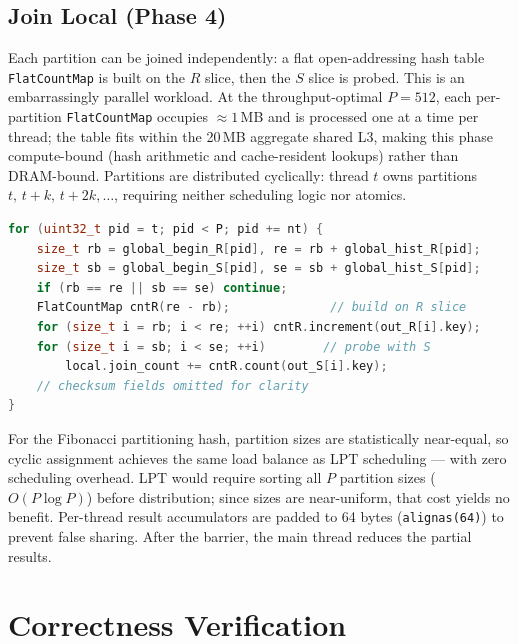 \documentclass[10pt,a4paper,twocolumn]{article}
\begin{document}
\subsection*{Join Local (Phase 4)}

Each partition can be joined independently: a flat open-addressing hash table \texttt{FlatCountMap} is built on the $R$ slice, then the $S$ slice is probed. This is an embarrassingly parallel workload. At the throughput-optimal $P=512$, each per-partition \texttt{FlatCountMap} occupies $\approx1$\,MB and is processed one at a time per thread; the table fits within the 20\,MB aggregate shared L3, making this phase compute-bound (hash arithmetic and cache-resident lookups) rather than DRAM-bound. Partitions are distributed cyclically: thread $t$ owns partitions $t,\,t{+}k,\,t{+}2k,\ldots$, requiring neither scheduling logic nor atomics.

\noindent\begin{minipage}{\linewidth}
\begin{lstlisting}[language=C++,belowskip=0pt,aboveskip=3pt]
for (uint32_t pid = t; pid < P; pid += nt) {
    size_t rb = global_begin_R[pid], re = rb + global_hist_R[pid];
    size_t sb = global_begin_S[pid], se = sb + global_hist_S[pid];
    if (rb == re || sb == se) continue;
    FlatCountMap cntR(re - rb);              // build on R slice
    for (size_t i = rb; i < re; ++i) cntR.increment(out_R[i].key);
    for (size_t i = sb; i < se; ++i)        // probe with S
        local.join_count += cntR.count(out_S[i].key);
    // checksum fields omitted for clarity
}
\end{lstlisting}
\end{minipage}

For the Fibonacci partitioning hash, partition sizes are statistically near-equal, so cyclic assignment achieves the same load balance as LPT scheduling — with zero scheduling overhead. LPT would require sorting all $P$ partition sizes ($O(P\log P)$) before distribution; since sizes are near-uniform, that cost yields no benefit. Per-thread result accumulators are padded to 64 bytes (\texttt{alignas(64)}) to prevent false sharing. After the barrier, the main thread reduces the partial results.

\section{Correctness Verification}
\end{document}
